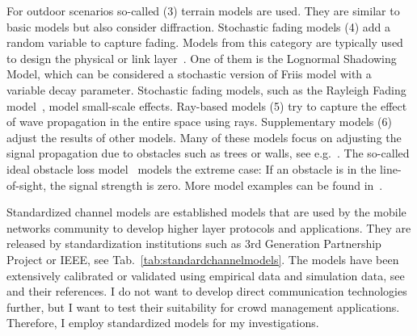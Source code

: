For outdoor scenarios so-called (3) terrain models are used. They are similar to basic models but also consider diffraction. Stochastic fading models (4) add a random variable to capture fading. Models from this category are typically used to design the physical or link layer~\cite{phillips-2013-com}. One of them is the Lognormal Shadowing Model, which can be considered a stochastic version of Friis model with a variable decay parameter. Stochastic fading models, such as the Rayleigh Fading model~\cite{sklar-1997-com}, model small-scale effects. 
Ray-based models (5)  try to capture the effect of wave propagation in the entire space using rays. Supplementary models (6) adjust the results of other models. Many of these models focus on adjusting the signal propagation due to obstacles such as trees or walls, see e.g.~\cite{durgin-1998-com,jong-2004-com,torrico-1998-com}. The so-called ideal obstacle loss model~\cite[p.75]{virdis-2019-com} models the extreme case: If an obstacle is in the line-of-sight, the signal strength is zero. More model examples can be found in~\cite{phillips-2013-com}. 



Standardized channel models are established models that are used by the mobile networks community to develop higher layer protocols and applications.
They are released by standardization institutions such as 3rd Generation Partnership Project  or IEEE, see Tab.~\ref{tab:standardchannelmodels}. The models have been extensively calibrated or validated using empirical data and simulation data, see \cite{erceg-2004-com, winner-2007-com,3gpp2-2003-com,3gpptr36873-2017-com,liu-2012-com,itu-2017-com,tr38901-2018-com,raschkowski-2015-com,peter-2017-com,jaeckel-2019-com} and their references.  I do not want to develop direct communication technologies further, but I want to test their suitability for crowd management applications. Therefore, I employ standardized models for my investigations.
 

